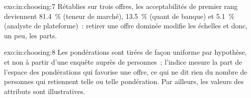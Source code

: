 \begin{solution}{exo:in:choosing:7}
Rétablies sur trois offres, les acceptabilités de premier rang deviennent 81.4~\% (teneur de marché), 13.5~\% (quant de banque) et 5.1~\%
(analyste de plateforme)~: retirer une offre dominée modifie les échelles et donc, un peu, les parts.
\end{solution}

\begin{solution}{exo:in:choosing:8}
Les pondérations sont tirées de façon uniforme par hypothèse, et non à partir d'une enquête auprès de personnes~; l'indice mesure la part de l'espace des pondérations qui favorise une offre,
ce qui ne dit rien du nombre de personnes qui retiennent telle ou telle pondération. Par ailleurs, les valeurs des attributs sont
illustratives.
\end{solution}

